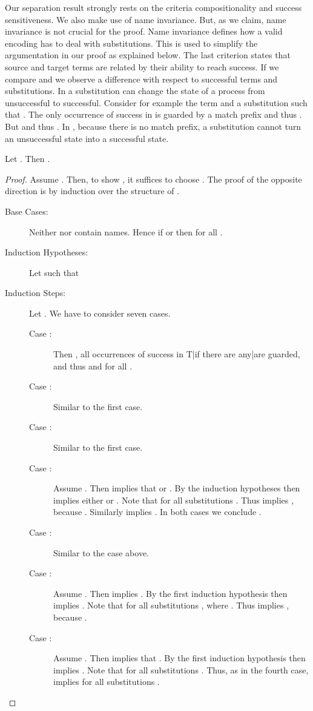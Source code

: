 \documentclass[]{article}
\begin{document}
Our separation result strongly rests on the criteria compositionality and success sensitiveness.
We also make use of name invariance.
But, as we claim, name invariance is not crucial for the proof. Name invariance defines how a valid encoding has to deal with substitutions. This is used to simplify the argumentation in our proof as explained below.
The last criterion states that source and target terms are related by their ability to reach success.
If we compare \piT and \piNM we observe a difference with respect to successful terms and substitutions.
In \piT a substitution can change the state of a process from unsuccessful to successful. Consider for example the term  and a substitution  such that . The only occurrence of success in  is guarded by a match prefix and thus . But  and thus .
In \piNM, because there is no match prefix, a substitution cannot turn an unsuccessful state into a successful state.

\begin{lemma}
	\label{prop:propequiv}
	Let . Then .
\end{lemma}

\begin{proof}
	Assume . Then, to show , it suffices to choose .
	The proof of the opposite direction is by induction over the structure of .
	\begin{description}
		\item[Base Cases:] Neither  nor  contain names. Hence if  or  then  for all .
		\item[Induction Hypotheses:] Let  such that
			
		\item[Induction Steps:] Let . We have to consider seven cases.
			\begin{description}
				\item[Case :] Then , \ie all occurrences of success in T|if there are any|are guarded, and thus  and  for all .
				\item[Case :] Similar to the first case.
				\item[Case :] Similar to the first case.
				\item[Case :] Assume . Then  implies that  or . By the induction hypotheses then  implies either  or . Note that  for all substitutions . Thus  implies , because . Similarly  implies . In both cases we conclude .
				\item[Case :] Similar to the case above.\item[Case :] Assume . Then  implies . By the first induction hypothesis then  implies . Note that  for all substitutions , where . Thus  implies , because .
				\item[Case :] Assume . Then  implies that . By the first induction hypothesis then  implies . Note that  for all substitutions . Thus, as in the fourth case,  implies  for all substitutions .
			\end{description}
	\end{description}
\end{proof}
\end{document}
